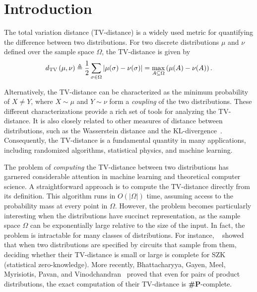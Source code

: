 \section{Introduction}
The total variation distance (TV-distance) is a widely used metric for quantifying the difference between two distributions. For two discrete distributions \(\mu\) and \(\nu\) defined over the sample space \(\Omega\), the TV-distance is given by  
\[
d_{\mathrm{TV}}\left({\mu},{\nu}\right) \triangleq \frac{1}{2}\sum_{\sigma \in \Omega} \left\vert\mu(\sigma) - \nu(\sigma)\right\vert = \max_{A \subseteq \Omega} \left(\mu(A) - \nu(A)\right).
\]

Alternatively, the TV-distance can be characterized as the minimum probability of \(X \neq Y\), where \(X \sim \mu\) and \(Y \sim \nu\) form a \emph{coupling} of the two distributions. These different characterizations provide a rich set of tools for analyzing the TV-distance. It is also closely related to other measures of distance between distributions, such as the Wasserstein distance and the KL-divergence~\cite{mitzenmacher2017probability}. Consequently, the TV-distance is a fundamental quantity in many applications, including randomized algorithms, statistical physics, and machine learning.


The problem of \emph{computing} the TV-distance between two distributions has garnered considerable attention in machine learning and theoretical computer science. 
A straightforward approach is to compute the TV-distance directly from its definition. This algorithm runs in \(O(|\Omega|)\) time, assuming access to the probability mass at every point in \(\Omega\). However, the problem becomes particularly interesting when the distributions have succinct representation, as the sample space \(\Omega\) can be exponentially large relative to the size of the input.
In fact, the problem is intractable for many classes of distributions. For instance, ~\cite{sahai2003complete} showed that when two distributions are specified by circuits that sample from them, deciding whether their TV-distance is small or large is complete for SZK (statistical zero-knowledge). More recently, Bhattacharyya, Gayen, Meel, Myrisiotis, Pavan, and Vinodchandran~\cite{0001GMMPV23} proved that even for pairs of product distributions, the exact computation of their TV-distance is \textbf{\#P}-complete.

%
%

